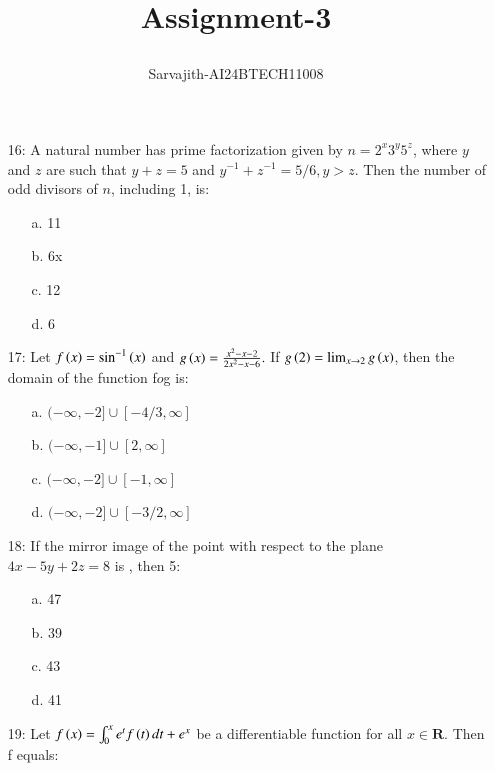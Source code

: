 \documentclass[journal,12pt,twocolumn]{IEEEtran}
\title{Assignment-3

}
\author{Sarvajith-AI24BTECH11008}
\theoremstyle{remark}
\begin{document}
\maketitle

\begin{enumerate}
\item[16:] A natural number has prime factorization given by $n = 2^x3^y5^z$, where $y$ and $z$ are such that $y + z = 5$ and $y^{-1} + z^{-1} = 5/6, y>z$. Then the number of odd divisors of $n$, including 1, is:
\begin{multicols}{2}
\begin{enumerate}
    \item [a.] 11
    \item [b.] 6x
	    \columnbreak
    \item [c.] 12
    \item [d.] 6   
\end{enumerate}
\end{multicols}
\item[17:] Let $f\left(x\right) = \sin ^{-1} \left(x\right)$ and $g\left(x\right) = \frac{x^2-x-2}{2x^2-x-6}.$ If $g\left(2\right) =\lim_{x\rightarrow2}g\left(x\right)$, then the domain of the function f$o$g is:
\begin{multicols}{2}
\begin{enumerate}
    \item [a.] $(-\infty,-2]\cup[-4/3,\infty]$
    \item [b.] $(-\infty,-1]\cup[2,\infty]$
	    \columnbreak
    \item [c.] $(-\infty,-2]\cup[-1,\infty]$
    \item [d.] $(-\infty,-2]\cup[-3/2,\infty]$
\end{enumerate}
\end{multicols}
\item[18:] If the mirror image of the point  with respect to the plane $4x-5y+2z=8$ is \brak{\alpha,\beta,\gamma}, then
5\brak{\alpha+\beta+\gamma}:
\begin{multicols}{2}
\begin{enumerate}
    \item [a.] 47
    \item [b.] 39
	    \columnbreak
    \item [c.] 43
    \item [d.] 41  
\end{enumerate}
\end{multicols}
\item[19:] Let $f\left(x\right)=\int_0 ^x e^t f\left(t\right)dt + e^x $ be a differentiable function for all $x\in \mathbf{R}$. Then f equals:

\end{enumerate}
\end{document}
